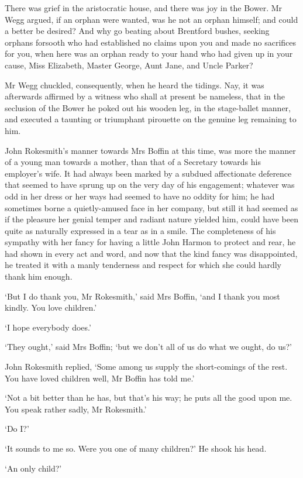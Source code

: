 There was grief in the aristocratic house, and there was joy in the
Bower. Mr Wegg argued, if an orphan were wanted, was he not an orphan
himself; and could a better be desired? And why go beating about
Brentford bushes, seeking orphans forsooth who had established no claims
upon you and made no sacrifices for you, when here was an orphan ready
to your hand who had given up in your cause, Miss Elizabeth, Master
George, Aunt Jane, and Uncle Parker?

Mr Wegg chuckled, consequently, when he heard the tidings. Nay, it was
afterwards affirmed by a witness who shall at present be nameless,
that in the seclusion of the Bower he poked out his wooden leg, in the
stage-ballet manner, and executed a taunting or triumphant pirouette on
the genuine leg remaining to him.

John Rokesmith’s manner towards Mrs Boffin at this time, was more the
manner of a young man towards a mother, than that of a Secretary towards
his employer’s wife. It had always been marked by a subdued affectionate
deference that seemed to have sprung up on the very day of his
engagement; whatever was odd in her dress or her ways had seemed to have
no oddity for him; he had sometimes borne a quietly-amused face in her
company, but still it had seemed as if the pleasure her genial temper
and radiant nature yielded him, could have been quite as naturally
expressed in a tear as in a smile. The completeness of his sympathy with
her fancy for having a little John Harmon to protect and rear, he
had shown in every act and word, and now that the kind fancy was
disappointed, he treated it with a manly tenderness and respect for
which she could hardly thank him enough.

‘But I do thank you, Mr Rokesmith,’ said Mrs Boffin, ‘and I thank you
most kindly. You love children.’

‘I hope everybody does.’

‘They ought,’ said Mrs Boffin; ‘but we don’t all of us do what we ought,
do us?’

John Rokesmith replied, ‘Some among us supply the short-comings of the
rest. You have loved children well, Mr Boffin has told me.’

‘Not a bit better than he has, but that’s his way; he puts all the good
upon me. You speak rather sadly, Mr Rokesmith.’

‘Do I?’

‘It sounds to me so. Were you one of many children?’ He shook his head.

‘An only child?’

